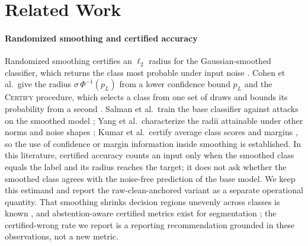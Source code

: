 
\section{Related Work}

\paragraph{Randomized smoothing and certified accuracy}
Randomized smoothing certifies an $\ell_2$ radius for the Gaussian-smoothed classifier, which returns the class most probable under input noise \cite{lecuyer2019pixeldp,li2019certified,cohen2019smoothing}. Cohen et al.\ give the radius $\sigma\,\Phi^{-1}(p_L)$ from a lower confidence bound $p_L$ and the \textsc{Certify} procedure, which selects a class from one set of draws and bounds its probability from a second \cite{cohen2019smoothing}. Salman et al.\ train the base classifier against attacks on the smoothed model \cite{salman2019provably}; Yang et al.\ characterize the radii attainable under other norms and noise shapes \cite{yang2020randomized}; Kumar et al.\ certify average class scores and margins \cite{kumar2020certifying}, so the use of confidence or margin information inside smoothing is established. In this literature, certified accuracy counts an input only when the smoothed class equals the label and its radius reaches the target; it does not ask whether the smoothed class agrees with the noise-free prediction of the base model. We keep this estimand and report the raw-clean-anchored variant as a separate operational quantity. That smoothing shrinks decision regions unevenly across classes is known \cite{mohapatra2021hidden}, and abstention-aware certified metrics exist for segmentation \cite{anani2024adaptive}; the certified-wrong rate we report is a reporting recommendation grounded in these observations, not a new metric.

